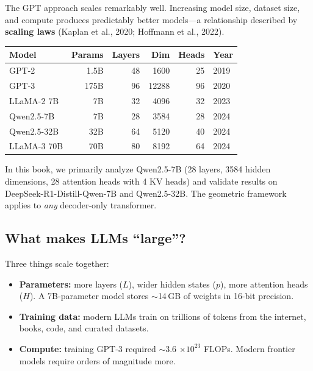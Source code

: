 \documentclass[11pt, twoside, openright]{memoir}
\begin{document}
The GPT approach scales remarkably well.  Increasing model size,
dataset size, and compute produces predictably better models---a
relationship described by \textbf{scaling laws} (Kaplan et al., 2020;
Hoffmann et al., 2022).

\begin{center}\small
\begin{tabular}{@{}lrrrrl@{}}
\toprule
\textbf{Model} & \textbf{Params} & \textbf{Layers} & \textbf{Dim} & \textbf{Heads} & \textbf{Year} \\
\midrule
GPT-2       & 1.5B  & 48  & 1600  & 25  & 2019 \\
GPT-3       & 175B  & 96  & 12288 & 96  & 2020 \\
LLaMA-2 7B  & 7B    & 32  & 4096  & 32  & 2023 \\
Qwen2.5-7B  & 7B    & 28  & 3584  & 28  & 2024 \\
Qwen2.5-32B & 32B   & 64  & 5120  & 40  & 2024 \\
LLaMA-3 70B & 70B   & 80  & 8192  & 64  & 2024 \\
\bottomrule
\end{tabular}
\end{center}

\begin{finding}
In this book, we primarily analyze Qwen2.5-7B (28 layers, 3584 hidden
dimensions, 28 attention heads with 4 KV heads) and validate results on
DeepSeek-R1-Distill-Qwen-7B and Qwen2.5-32B.  The geometric framework
applies to \emph{any} decoder-only transformer.
\end{finding}

\subsection{What makes LLMs ``large''?}

Three things scale together:
\begin{itemize}[nosep]
\item \textbf{Parameters:} more layers ($L$), wider hidden states ($p$),
  more attention heads ($H$).  A 7B-parameter model stores $\sim$14\,GB of
  weights in 16-bit precision.
\item \textbf{Training data:} modern LLMs train on trillions of tokens from
  the internet, books, code, and curated datasets.
\item \textbf{Compute:} training GPT-3 required $\sim$3.6 $\times 10^{23}$
  FLOPs.  Modern frontier models require orders of magnitude more.
\end{itemize}
\end{document}
